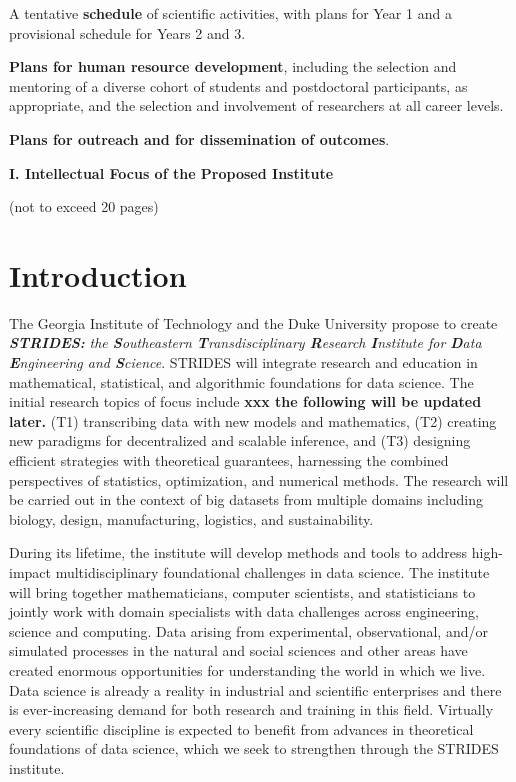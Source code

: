 \documentclass[12pt]{article}
\begin{document}
A tentative {\bf schedule} of scientific activities, with plans for Year 1 and a provisional schedule for Years 2 and 3.

{\bf Plans for human resource development}, including the selection and mentoring of a diverse cohort of students and postdoctoral participants, as appropriate, and the selection and involvement of researchers at all career levels.

{\bf Plans for outreach and for dissemination of outcomes}.

\clearpage
\setcounter{page}{1}

\begin{center}
{\bf\large I. Intellectual Focus of the Proposed Institute}
\end{center}
 (not to exceed 20 pages)

\section{Introduction}

The Georgia Institute of Technology and the Duke University propose to create {\it \bf STRIDES:} {\it the {\bf S}outheastern {\bf T}ransdisciplinary {\bf R}esearch {\bf I}nstitute for {\bf D}ata {\bf E}ngineering and {\bf S}cience}.
STRIDES will integrate research and education in mathematical, statistical, and algorithmic foundations for data science.
The initial research topics of focus include {\bf xxx the following will be updated later.}
(T1) transcribing data with new models and mathematics,
(T2) creating new paradigms for decentralized and scalable inference,
and (T3) designing efficient strategies with theoretical guarantees, harnessing the combined
perspectives of statistics, optimization, and numerical methods.
The research will be carried out in the context of big datasets from multiple domains
including biology, design, manufacturing, logistics, and sustainability.

During its lifetime, the institute will develop methods and tools to address
high-impact multidisciplinary foundational challenges in data science.  The institute
will bring together mathematicians, computer scientists, and statisticians to jointly
work with domain specialists with data challenges across engineering, science and computing.
Data arising from experimental, observational, and/or simulated processes in the natural and
social sciences and other areas have created enormous opportunities for understanding the
world in which we live. Data science is already a reality in industrial and scientific
enterprises and there is ever-increasing demand for both research and training in this field.
Virtually every scientific discipline is expected to benefit from advances in theoretical
foundations of data science, which we seek to strengthen through the STRIDES institute.
\end{document}
